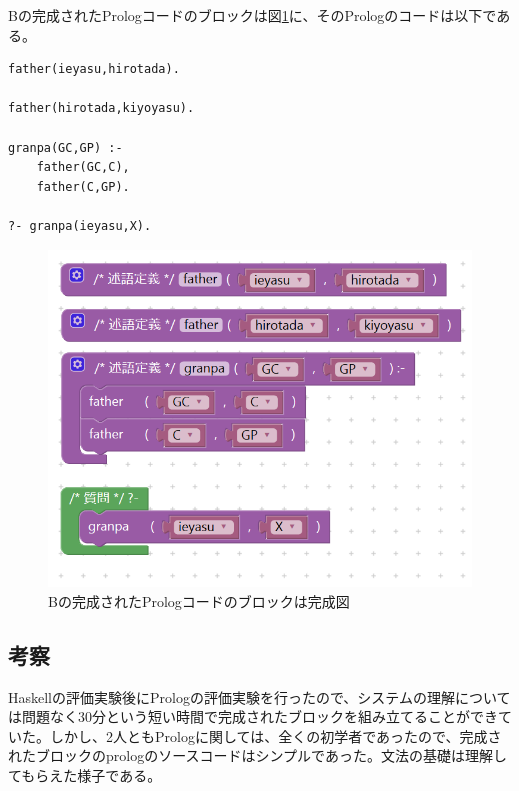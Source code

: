 \documentclass{risepaper}
\begin{document}
\begin{itemize}
Bの完成されたPrologコードのブロックは図\ref{fig:prolog_experiment_result_b}に、そのPrologのコードは以下である。
\begin{lstlisting}[basicstyle=\ttfamily\footnotesize]
father(ieyasu,hirotada).

father(hirotada,kiyoyasu).

granpa(GC,GP) :-
    father(GC,C),
    father(C,GP).

?- granpa(ieyasu,X).
\end{lstlisting}

\begin{figure}[h]
\begin{center}
\includegraphics[scale=0.5]{img/prolog_experiment_result_b.PNG}
\caption{Bの完成されたPrologコードのブロックは完成図}%
\label{fig:prolog_experiment_result_b}
\end{center}%
\end{figure}%

\end{itemize} 
        
		\subsection{考察}
        
Haskellの評価実験後にPrologの評価実験を行ったので、システムの理解については問題なく30分という短い時間で完成されたブロックを組み立てることができていた。しかし、2人ともPrologに関しては、全くの初学者であったので、完成されたブロックのprologのソースコードはシンプルであった。文法の基礎は理解してもらえた様子である。
\end{document}
